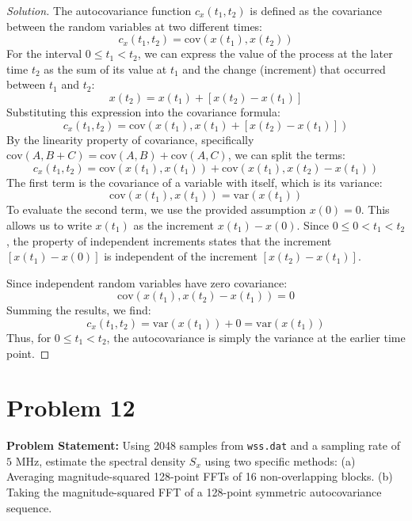 \documentclass{article}
\begin{document}
\begin{proof}[Solution]
	The autocovariance function $c_x(t_1, t_2)$ is defined as the covariance between the random variables at two different times:
	\[ c_x(t_1, t_2) = \text{cov}(x(t_1), x(t_2)) \]
	For the interval $0 \le t_1 < t_2$, we can express the value of the process at the later time $t_2$ as the sum of its value at $t_1$ and the change (increment) that occurred between $t_1$ and $t_2$:
	\[ x(t_2) = x(t_1) + [x(t_2) - x(t_1)] \]
	Substituting this expression into the covariance formula:
	\[ c_x(t_1, t_2) = \text{cov}(x(t_1), x(t_1) + [x(t_2) - x(t_1)]) \]
	By the linearity property of covariance, specifically $\text{cov}(A, B+C) = \text{cov}(A, B) + \text{cov}(A, C)$, we can split the terms:
	\[ c_x(t_1, t_2) = \text{cov}(x(t_1), x(t_1)) + \text{cov}(x(t_1), x(t_2) - x(t_1)) \]
	The first term is the covariance of a variable with itself, which is its variance:
	\[ \text{cov}(x(t_1), x(t_1)) = \text{var}(x(t_1)) \]
	To evaluate the second term, we use the provided assumption $x(0) = 0$. This allows us to write $x(t_1)$ as the increment $x(t_1) - x(0)$. Since $0 \le 0 < t_1 < t_2$, the property of independent increments states that the increment $[x(t_1) - x(0)]$ is independent of the increment $[x(t_2) - x(t_1)]$.
	
	Since independent random variables have zero covariance:
	\[ \text{cov}(x(t_1), x(t_2) - x(t_1)) = 0 \]
	Summing the results, we find:
	\[ c_x(t_1, t_2) = \text{var}(x(t_1)) + 0 = \text{var}(x(t_1)) \]
	Thus, for $0 \le t_1 < t_2$, the autocovariance is simply the variance at the earlier time point.
\end{proof}

\section*{Problem 12}
\textbf{Problem Statement:}
Using 2048 samples from \texttt{wss.dat} and a sampling rate of $5 \text{ MHz}$, estimate the spectral density $S_x$ using two specific methods:
(a) Averaging magnitude-squared 128-point FFTs of 16 non-overlapping blocks.
(b) Taking the magnitude-squared FFT of a 128-point symmetric autocovariance sequence.
\end{document}
